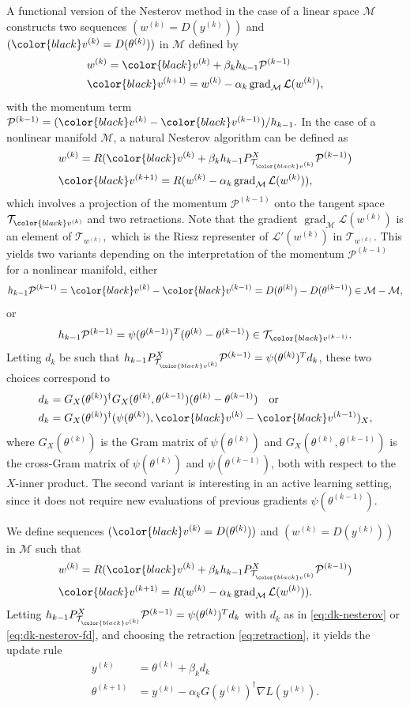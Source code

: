 \documentclass{article}
\theoremstyle{noparens}
\newcommand{\cL}{\mathcal{L}}
\newcommand{\cT}{\mathcal{T}}
\newcommand{\cM}{\mathcal{M}}
\newcommand{\cP}{\mathcal{P}}
\newcommand{\colorM}{\color{black}}
\newcommand{\paramk}{\theta^{(k)}}
\newcommand{\paramkm}{\theta^{(k-1)}}
\newcommand{\paramkp}{\theta^{(k+1)}}
\newcommand{\yk}{y^{(k)}}
\newcommand{\wk}{w^{(k)}}
\newcommand{\vk}{{\colorM v^{(k)}}}
\newcommand{\vkm}{{\colorM v^{(k-1)}}}
\newcommand{\vkp}{{\colorM v^{(k+1)}}}
\newcommand{\gradM}{\operatorname{grad}_{\cM}}
\begin{document}
A functional version of the Nesterov method in the case of a linear space $\cM$ constructs two sequences $(\wk = D(\yk))$ and $(\vk = D(\paramk))$ in $\cM$ defined by
\begin{align*}
&\wk = \vk + \beta_k h_{k-1} \cP^{(k-1)} \\
&\vkp = \wk - \alpha_k \gradM \cL(\wk),
\end{align*}
with the momentum term $\cP^{(k-1)} = (\vk - \vkm) / {h_{k-1}}.$
In the case of a nonlinear manifold $\cM$, a natural Nesterov algorithm can be defined as
\begin{align*}
&\wk = R(\vk + \beta_k h_{k-1} P^X_{\cT_{\vk}} \cP^{(k-1)}) \\
&\vkp = R(\wk - \alpha_k \gradM \cL(\wk)),
\end{align*}
which involves a projection of the momentum  $\cP^{(k-1)}$  onto the tangent space $\cT_{\vk}$ and two retractions. Note that the gradient $\gradM\cL(\wk)$ is an element of $\cT_{\wk},$ which is the Riesz representer of $\cL'(\wk)$ in $\cT_{\wk}$.
This yields two variants depending on the interpretation of the momentum $\cP^{(k-1)}$ for a nonlinear manifold, either $${h_{k-1}} \cP^{(k-1)} = \vk - \vkm   = D(\paramk) - D(\paramkm)  \in \cM - \cM,$$ or
$$
{h_{k-1}} \cP^{(k-1)} = \psi(\paramkm)^T (\paramk-\paramkm) \in \cT_{\vkm}.
$$
Letting $d_k$ be such that $h_{k-1}P^X_{\cT_{\vk}} \cP^{(k-1)} = \psi(\paramk)^T d_k$, these two choices  correspond to \begin{align}
d_k &= G_X(\paramk)^\dagger G_X(\paramk,\paramkm) (\paramk-\paramkm) \label{eq:dk-nesterov} \quad \text{or} \\
d_k &= G_X(\paramk)^\dagger (\psi(\paramk) , \vk-\vkm)_X, \label{eq:dk-nesterov-fd}
\end{align}
where $G_X(\paramk)$ is the Gram matrix of $\psi(\paramk)$ and $G_X(\paramk,\paramkm)$ is the cross-Gram matrix of $\psi(\paramk)$ and $\psi(\paramkm)$, both with respect to the $X$-inner product.  The second variant is interesting in an active learning setting, since it does not require new evaluations of previous gradients $\psi(\paramkm)$.
\begin{definition}
\label{def:nn-I}
We define sequences $(\vk = D(\paramk))$ and $(\wk=D(\yk))$ in $\cM$ such that
\begin{align*}
&\wk = R(\vk + \beta_k h_{k-1}    P^X_{\cT_{\vk}}\cP^{(k-1)})    \\
&\vkp = R(\wk - \alpha_k \gradM \cL(\wk)).
\end{align*}
Letting $h_{k-1}P^X_{\cT_{\vk}}\cP^{(k-1)} = \psi(\paramk)^T d_k$ with $d_k$ as in \eqref{eq:dk-nesterov} or \eqref{eq:dk-nesterov-fd}, and choosing
the retraction \eqref{eq:retraction}, it yields the update rule
\begin{align*}
\yk &= \paramk + \beta_k d_k
\\
\paramkp &= \yk - \alpha_k G(\yk)^\dagger \nabla L(\yk).
\end{align*}
\end{definition}
\end{document}
